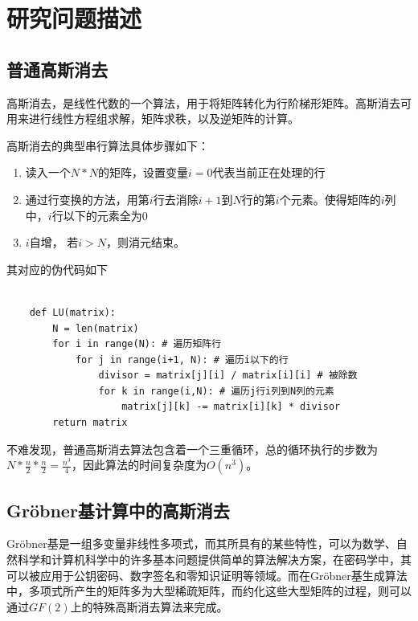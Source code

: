 \documentclass[a4paper]{article}
\begin{document}
\section{研究问题描述}
\subsection{普通高斯消去}
高斯消去，是线性代数的一个算法，用于将矩阵转化为行阶梯形矩阵。高斯消去可用来进行线性方程组求解，矩阵求秩，以及逆矩阵的计算。



高斯消去的典型串行算法具体步骤如下：


\begin{enumerate}
  \item 读入一个$N*N$的矩阵，设置变量$i=0$代表当前正在处理的行
  \item 通过行变换的方法，用第$i$行去消除$i+1$到$N$行的第$i$个元素。使得矩阵的$i$列中，$i$行以下的元素全为0
  \item $i$自增， 若$i>N$，则消元结束。
\end{enumerate}



其对应的伪代码如下


\begin{verbatim}

    def LU(matrix):
        N = len(matrix)
        for i in range(N): # 遍历矩阵行
            for j in range(i+1, N): # 遍历i以下的行
                divisor = matrix[j][i] / matrix[i][i] # 被除数
                for k in range(i,N): # 遍历j行i列到N列的元素
                    matrix[j][k] -= matrix[i][k] * divisor
        return matrix
\end{verbatim}

不难发现，普通高斯消去算法包含着一个三重循环，总的循环执行的步数为$N*\frac{n}{2}*\frac{n}{2} = \frac{n^{3}}{4}$，因此算法的时间复杂度为$O(n^{3})$。


\subsection{Gröbner基计算中的高斯消去}
Gröbner基是一组多变量非线性多项式，而其所具有的某些特性，可以为数学、自然科学和计算机科学中的许多基本问题提供简单的算法解决方案，在密码学中，其可以被应用于公钥密码、数字签名和零知识证明等领域。而在Gröbner基生成算法中，多项式所产生的矩阵多为大型稀疏矩阵，而约化这些大型矩阵的过程，则可以通过$GF(2)$上的特殊高斯消去算法来完成。\cite{狄鹏2008Grobner}
\end{document}
